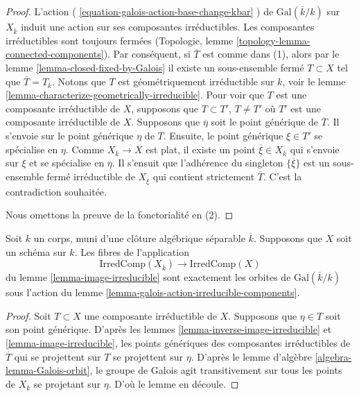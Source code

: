 \begin{proof}
L'action ( \ref{equation-galois-action-base-change-kbar} ) de
$\text{Gal}(\overline{k}/k)$ sur $X_{\overline{k}}$ induit
une action sur ses composantes irréductibles. Les composantes
irréductibles sont toujours fermées (Topologie, lemme
\ref{topology-lemma-connected-components}). Par conséquent, si
$\overline{T}$ est comme dans (1), alors par le lemme
\ref{lemma-closed-fixed-by-Galois} il existe un sous-ensemble
fermé $T \subset X$ tel que $\overline{T} = T_{\overline{k}}$.
Notons que $T$ est géométriquement irréductible sur $k$, voir le
lemme \ref{lemma-characterize-geometrically-irreducible}. Pour
voir que $T$ est une composante irréductible de $X$, supposons
que $T \subset T'$, $T \not = T'$ où $T'$ est une composante
irréductible de $X$. Supposons que $\overline{\eta}$ soit le
point générique de $\overline{T}$. Il s'envoie sur le point
générique $\eta$ de $T$. Ensuite, le point générique $\xi \in
T'$ se spécialise en $\eta$. Comme $X_{\overline{k}} \to X$ est
plat, il existe un point $\overline{\xi} \in X_{\overline{k}}$
qui s'envoie sur $\xi$ et se spécialise en $\overline{\eta}$. Il
s'ensuit que l'adhérence du singleton $\{\overline{\xi}\}$ est un
sous-ensemble fermé irréductible de $X_{\overline{\xi}}$ qui
contient strictement $\overline{T}$. C'est la contradiction souhaitée.

\medskip\noindent
Nous omettons la preuve de la fonctorialité en (2).
\end{proof}

\begin{lemma}
\label{lemma-orbit-irreducible-components}
Soit $k$ un corps, muni d'une clôture
algébrique séparable $\overline{k}$. Supposons que
$X$ soit un schéma sur $k$. Les fibres de l'application
$$
\text{IrredComp}(X_{\overline{k}})
\longrightarrow
\text{IrredComp}(X)
$$
du lemme \ref{lemma-image-irreducible}
sont exactement les orbites de
$\text{Gal}(\overline{k}/k)$ sous l'action du lemme
\ref{lemma-galois-action-irreducible-components}.
\end{lemma}

\begin{proof}
Soit $T \subset X$ une composante
irréductible de $X$. Supposons que $\eta \in T$ soit
son point générique. D'après les lemmes
\ref{lemma-inverse-image-irreducible} et
\ref{lemma-image-irreducible}, les points génériques des
composantes irréductibles de $\overline{T}$ qui se
projettent sur $T$ se projettent sur $\eta$. D'après le lemme
d'algèbre \ref{algebra-lemma-Galois-orbit}, le groupe de
Galois agit transitivement sur tous les points de
$X_{\overline{k}}$ se projetant sur $\eta$. D'où le lemme en découle.
\end{proof}

